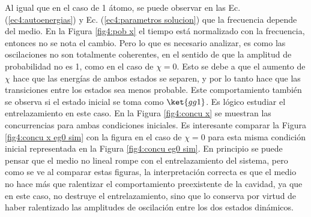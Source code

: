 Al igual que en el caso de 1 átomo, se puede observar en las Ec. (\ref{ec4:autoenergias}) y Ec. (\ref{ec4:parametros solucion}) que la frecuencia depende del medio. En la Figura \ref{fig4:pob x} el tiempo está normalizado con la frecuencia, entonces no se nota el cambio. Pero lo que es necesario analizar, es como las oscilaciones no son totalmente coherentes, en el sentido de que la amplitud de probabilidad no es 1, como en el caso de $\chi=0$. Esto se debe a que el aumento de $\chi$ hace que las energías de ambos estados se separen, y por lo tanto hace que las transiciones entre los estados sea menos probable. Este comportamiento también se observa si el estado inicial se toma como $\ket{gg1}$. Es lógico estudiar el entrelazamiento en este caso. En la Figura \ref{fig4:concu x} se muestran las concurrencias para ambas condiciones iniciales. Es interesante comparar la Figura \ref{fig4:concu x eg0 sim} con la figura en el caso de $\chi=0$ para esta misma condición inicial representada en la Figura \ref{fig4:concu eg0 sim}. En principio se puede pensar que el medio no lineal rompe con el entrelazamiento del sistema, pero como se ve al comparar estas figuras, la interpretación correcta es que el medio no hace más que ralentizar el comportamiento preexistente de la cavidad, ya que en este caso, no destruye el entrelazamiento, sino que lo conserva por virtud de haber ralentizado las amplitudes de oscilación entre los dos estados dinámicos.
